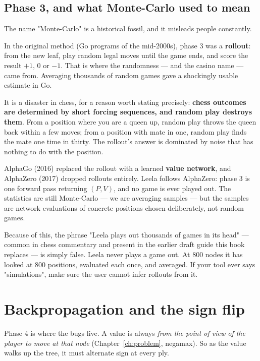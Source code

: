 \subsection{Phase 3, and what Monte-Carlo used to mean}

The name "Monte-Carlo" is a historical fossil, and it misleads people constantly.

In the original method (Go programs of the mid-2000s), phase 3 was a \textbf{rollout}: from
the new leaf, play random legal moves until the game ends, and score the result $+1$, $0$ or
$-1$. That is where the randomness --- and the casino name --- came from. Averaging thousands
of random games gave a shockingly usable estimate in Go.

It is a disaster in chess, for a reason worth stating precisely: \textbf{chess outcomes are
determined by short forcing sequences, and random play destroys them}. From a position where
you are a queen up, random play throws the queen back within a few moves; from a position
with mate in one, random play finds the mate one time in thirty. The rollout's answer is
dominated by noise that has nothing to do with the position.

\begin{established}
AlphaGo (2016) replaced the rollout with a learned \textbf{value network}, and AlphaZero
(2017) dropped rollouts entirely. Leela follows AlphaZero: phase 3 is one forward pass
returning $(P, V)$, and no game is ever played out. The statistics are still Monte-Carlo ---
we are averaging samples --- but the samples are network evaluations of concrete positions
chosen deliberately, not random games.
\end{established}

\begin{pitfall}
Because of this, the phrase "Leela plays out thousands of games in its head" --- common in
chess commentary and present in the earlier draft guide this book replaces --- is simply
false. Leela never plays a game out. At 800 nodes it has looked at 800 positions, evaluated
each once, and averaged. If your tool ever says "simulations", make sure the user cannot
infer rollouts from it.
\end{pitfall}

\section{Backpropagation and the sign flip}

Phase 4 is where the bugs live. A value is always \emph{from the point of view of the player
to move at that node} (Chapter~\ref{ch:problem}, negamax). So as the value walks up the tree,
it must alternate sign at every ply.

